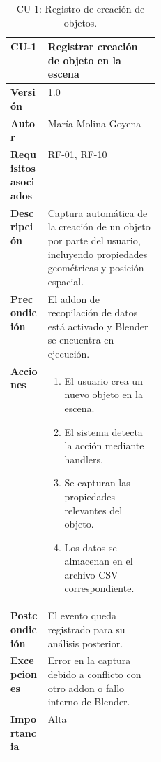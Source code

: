 \begin{table}[p]
\centering
\begin{tabularx}{\linewidth}{p{0.25\linewidth} X}
\toprule
\textbf{CU-1} & Registrar creación de objeto en la escena \\
\midrule
\textbf{Versión} & 1.0 \\
\textbf{Autor} & María Molina Goyena \\
\textbf{Requisitos asociados} & RF-01, RF-10 \\
\textbf{Descripción} & Captura automática de la creación de un objeto por parte del usuario, incluyendo propiedades geométricas y posición espacial. \\
\textbf{Precondición} & El addon de recopilación de datos está activado y Blender se encuentra en ejecución. \\
\textbf{Acciones} &
\begin{minipage}[t]{\linewidth}
\begin{enumerate}
    \item El usuario crea un nuevo objeto en la escena.
    \item El sistema detecta la acción mediante handlers.
    \item Se capturan las propiedades relevantes del objeto.
    \item Los datos se almacenan en el archivo CSV correspondiente.
\end{enumerate}
\end{minipage} \\
\textbf{Postcondición} & El evento queda registrado para su análisis posterior. \\
\textbf{Excepciones} & Error en la captura debido a conflicto con otro addon o fallo interno de Blender. \\
\textbf{Importancia} & Alta \\
\bottomrule
\end{tabularx}
\caption{CU-1: Registro de creación de objetos.}
\label{tab:cu1}
\end{table}

